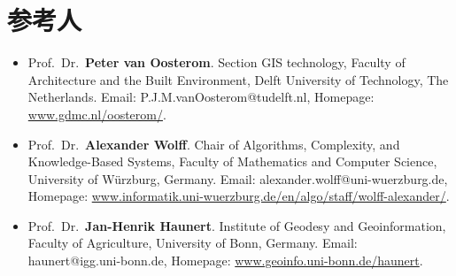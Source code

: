 \documentclass{resume}
\begin{document}
\section{参考人}
\begin{itemize}[parsep=1ex]

\item Prof.\ Dr.\ \textbf{Peter van Oosterom}.
	Section GIS technology,
	Faculty of Architecture and the Built Environment, 
	Delft University of Technology, The Netherlands.
	Email: P.J.M.vanOosterom@tudelft.nl,
	Homepage: \url{www.gdmc.nl/oosterom/}.

\item Prof.\ Dr.\ \textbf{Alexander Wolff}.
	Chair of Algorithms, Complexity, and Knowledge-Based Systems,
	Faculty of Mathematics and Computer Science, 
	University of W\"urzburg, Germany.
	Email: alexander.wolff@uni-wuerzburg.de,
	Homepage: \url{www.informatik.uni-wuerzburg.de/en/algo/staff/wolff-alexander/}.   

\item Prof.\ Dr.\ \textbf{Jan-Henrik Haunert}. 
	Institute of Geodesy and Geoinformation,
    Faculty of Agriculture,
	University of Bonn, Germany.
	Email: haunert@igg.uni-bonn.de,
	Homepage: \url{www.geoinfo.uni-bonn.de/haunert}.

\end{itemize}
   
\end{document}
